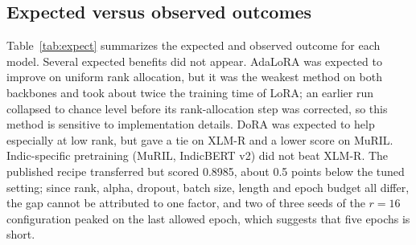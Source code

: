 \documentclass{svproc}
\begin{document}
\subsection{Expected versus observed outcomes}
Table~\ref{tab:expect} summarizes the expected and observed outcome for each model. Several expected benefits did not appear. AdaLoRA was expected to improve on uniform rank allocation, but it was the weakest method on both backbones and took about twice the training time of LoRA; an earlier run collapsed to chance level before its rank-allocation step was corrected, so this method is sensitive to implementation details. DoRA was expected to help especially at low rank, but gave a tie on XLM-R and a lower score on MuRIL. Indic-specific pretraining (MuRIL, IndicBERT v2) did not beat XLM-R. The published recipe transferred but scored 0.8985, about 0.5 points below the tuned setting; since rank, alpha, dropout, batch size, length and epoch budget all differ, the gap cannot be attributed to one factor, and two of three seeds of the $r=16$ configuration peaked on the last allowed epoch, which suggests that five epochs is short.
\end{document}
